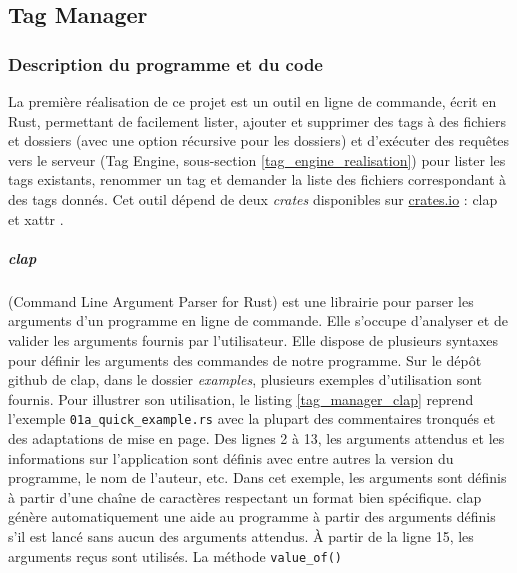 \subsection{Tag Manager}\label{tag_manager}
\subsubsection{Description du programme et du code}
La première réalisation de ce projet est un outil en ligne de commande, écrit en Rust, permettant 
de facilement lister, ajouter et supprimer des tags à des fichiers et dossiers (avec une option 
récursive pour les dossiers) et d'exécuter des requêtes vers le serveur (Tag Engine, sous-section 
\ref{tag_engine_realisation}) pour lister 
les tags existants, renommer un tag et demander la liste des fichiers correspondant à des tags 
donnés. Cet outil dépend de deux \textit{crates} disponibles sur \href{https://crates.io}{crates.io} 
: clap \cite{ref22} et xattr \cite{ref23}.
\subparagraph{clap}
(Command Line Argument Parser for Rust) est une 
librairie pour parser les arguments d'un programme en ligne de commande. Elle s'occupe d'analyser 
et de valider les arguments fournis par l'utilisateur. Elle dispose de plusieurs syntaxes pour 
définir les arguments des commandes de notre programme. Sur le dépôt github de clap, dans le 
dossier \textit{examples}, plusieurs exemples d'utilisation sont fournis. Pour illustrer son 
utilisation, le listing \ref{tag_manager_clap} reprend l'exemple \texttt{01a_quick_example.rs} 
avec la plupart des commentaires tronqués et des adaptations de mise en page. Des lignes 2 à 13, 
les arguments attendus et les informations sur l'application sont définis avec entre autres la 
version du programme, le nom de l'auteur, etc. Dans cet exemple, les arguments sont définis à 
partir d'une chaîne de caractères respectant un format bien spécifique. clap génère automatiquement 
une aide au programme à partir des arguments définis s'il est lancé sans aucun des arguments attendus.
À partir de la ligne 15, les arguments reçus sont utilisés. La méthode \texttt{value_of()} 
